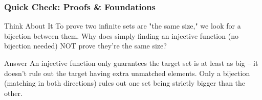 \begin{frame}[fragile]\frametitle{Quick Check: Proofs \& Foundations}
\begin{block}{Think About It}
To prove two infinite sets are "the same size," we look for a bijection between them. Why does simply finding an injective function (no bijection needed) NOT prove they're the same size?
\end{block}
\pause
\begin{block}{Answer}
An injective function only guarantees the target set is at least as big -- it doesn't rule out the target having extra unmatched elements. Only a bijection (matching in both directions) rules out one set being strictly bigger than the other.
\end{block}
\end{frame}
